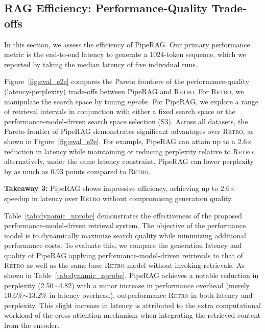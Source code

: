 \subsection{RAG Efficiency: Performance-Quality Trade-offs}

In this section, we assess the efficiency of PipeRAG. Our primary performance metric is the end-to-end latency to generate a 1024-token sequence, which we reported by taking the median latency of five individual runs. 

Figure~\ref{fig:eval_e2e} compares the Pareto frontiers of the performance-quality (latency-perplexity) trade-offs between PipeRAG and \textsc{Retro}.
For \textsc{Retro}, we manipulate the search space by tuning \( nprobe \).
For PipeRAG, we explore a range of retrieval intervals in conjunction with either a fixed search space or the performance-model-driven search space selection (S3).  
Across all datasets, the Pareto frontier of PipeRAG demonstrates significant advantages over \textsc{Retro}, as shown in Figure~\ref{fig:eval_e2e}. For example, PipeRAG can attain up to a 2.6$\times$ reduction in latency while maintaining or reducing perplexity relative to \textsc{Retro}; alternatively, under the same latency constraint, PipeRAG can lower perplexity by as much as 0.93 points compared to \textsc{Retro}.

\begin{tcolorbox}[
    enhanced,
    arc=2mm, %
    outer arc=2mm, %
    boxrule=0.8pt, %
    colframe=black, %
    colback=white, %
    boxsep=0pt, %
    drop shadow southeast, %
]
\textbf{Takeaway 3:} PipeRAG shows impressive efficiency, achieving up to 2.6$\times$ speedup in latency over \textsc{Retro} without compromising generation quality.
\end{tcolorbox}

Table~\ref{tab:dynamic_nprobe} demonstrates the effectiveness of the proposed performance-model-driven retrieval system. The objective of the performance model is to dynamically maximize search quality while minimizing additional performance costs.
To evaluate this, we compare the generation latency and quality of PipeRAG applying performance-model-driven retrievals to that of \textsc{Retro} as well as the same base \textsc{Retro} model without invoking retrievals.
As shown in Table~\ref{tab:dynamic_nprobe}, PipeRAG achieves a notable reduction in perplexity (2.50$\sim$4.82) with a minor increase in performance overhead (merely 10.6\%$\sim$13.2\% in latency overhead), outperformance \textsc{Retro} in both latency and perplexity. 
This slight increase in latency is attributed to the extra computational workload of the cross-attention mechanism when integrating the retrieved content from the encoder. 

